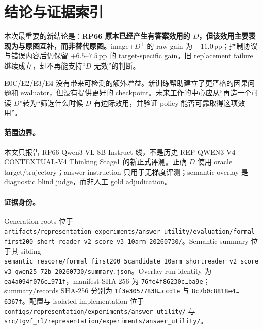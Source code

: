 \documentclass[UTF8,twocolumn,10pt,a4paper]{ctexart}
\newcommand{\Dpos}{D^{+}}
\newcommand{\code}[1]{\texttt{#1}}
\newcommand{\pp}{\,\mathrm{pp}}
\begin{document}
\balance
\section{结论与证据索引}

本次最重要的新结论是：\textbf{RP66 原本已经产生有答案效用的 $D$，但该效用主要表现为与原图互补，而非替代原图。}image+$\Dpos$ 的 raw gain 为 $+11.0\pp$；控制协议与错误内容后仍保留 $+6.5$--$7.5\pp$ 的 target-specific gain。旧 replacement failure 继续成立，却不再能支持“$D$ 无效”的判断。

E0C/E2/E3/E4 没有带来可检测的额外增益。新训练帮助建立了更严格的因果问题和 evaluator，但没有提供更好的 checkpoint。未来工作的中心应从“再造一个可读 $D$”转为“筛选什么时候 $D$ 有边际效用，并验证 policy 能否可靠取得这项效用”。

\paragraph{范围边界。}
本文只报告 RP66 Qwen3-VL-8B-Instruct 线，不是历史 REP-QWEN3-V4-CONTEXTUAL-V4 Thinking Stage1 的新正式评测。正确 $D$ 使用 oracle target/trajectory；answer instruction 只用于无梯度评测；semantic overlay 是 diagnostic blind judge，而非人工 gold adjudication。

\paragraph{证据身份。}
Generation roots 位于 \nolinkurl{artifacts/representation_experiments/answer_utility/evaluation/formal_first200_short_reader_v2_score_v3_10arm_20260730/}。Semantic summary 位于其 sibling \nolinkurl{semantic_rescore/formal_first200_5candidate_10arm_shortreader_v2_scorev3_qwen25_72b_20260730/summary.json}。Overlay run identity 为 \code{ea4a094f076e\ldots{}971f}，manifest SHA-256 为 \code{76fe4f86230c\ldots{}ba9e}；summary/records SHA-256 分别为 \code{1f3e30577838\ldots{}ccd1e} 与 \code{8c7b0c8818e4\ldots{}6367f}。配置与 isolated implementation 位于 \nolinkurl{configs/representation/experiments/answer_utility/} 与 \nolinkurl{src/tgvf_rl/representation/experiments/answer_utility/}。
\end{document}
